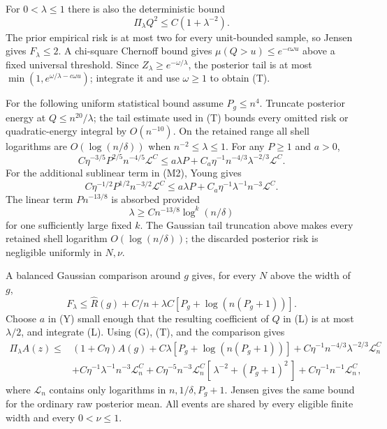 For $0<\lambda\le1$ there is also the deterministic bound
\[
 \Pi_\lambda Q^2\le C(1+\lambda^{-2}). \tag{T}
\]
The prior empirical risk is at most two for every unit-bounded
sample, so Jensen gives $F_\lambda\le2$. A chi-square Chernoff
bound gives $\mu(Q>u)\le e^{-c\omega u}$ above a fixed universal
threshold. Since $Z_\lambda\ge e^{-\omega/\lambda}$,
the posterior tail is at most
$\min(1,e^{\omega/\lambda-c\omega u})$; integrate it and use
$\omega\ge1$ to obtain (T).

For the following uniform statistical bound assume $P_g\le n^4$.
Truncate posterior energy at $Q\le n^{20}/\lambda$; the tail estimate
used in (T) bounds every omitted risk or quadratic-energy integral
by $O(n^{-10})$. On the retained range all shell logarithms are
$O(\log(n/\delta))$ when $n^{-2}\le\lambda\le1$.
For any $P\ge1$ and $a>0$,
\[
 C\eta^{-3/5}P^{2/5}n^{-4/5}\mathcal L^C
 \le a\lambda P+
 C_a\eta^{-1}n^{-4/3}\lambda^{-2/3}\mathcal L^C. \tag{Y}
\]
For the additional sublinear term in (M2), Young gives
\[
 C\eta^{-1/2}P^{1/2}n^{-3/2}\mathcal L^C
 \le a\lambda P+C_a\eta^{-1}\lambda^{-1}n^{-3}\mathcal L^C.
\]
The linear term $Pn^{-13/8}$ is absorbed provided
\[
 \lambda\ge C n^{-13/8}\log^k(n/\delta)
\]
for one sufficiently large fixed $k$. The Gaussian tail truncation
above makes every retained shell logarithm $O(\log(n/\delta))$;
the discarded posterior risk is negligible uniformly in $N,\nu$.

A balanced Gaussian comparison around $g$ gives, for every
$N$ above the width of $g$,
\[
 F_\lambda\le\widehat R(g)
       +C/n+\lambda C[P_g+\log(n(P_g+1))].
\]
Choose $a$ in (Y) small enough that the resulting coefficient
of $Q$ in (L) is at most $\lambda/2$, and integrate (L).
Using (G), (T), and the comparison gives
\begin{align}
 \Pi_\lambda A(z)
 \le &(1+C\eta)A(g)
 +C\lambda[P_g+\log(n(P_g+1))]
 +C\eta^{-1}n^{-4/3}\lambda^{-2/3}\mathcal L_n^C\\
 &+C\eta^{-1}\lambda^{-1}n^{-3}\mathcal L_n^C
 +C\eta^{-5}n^{-3}\mathcal L_n^C
       [\,\lambda^{-2}+(P_g+1)^2\,]+C\eta^{-1}n^{-1}\mathcal L_n^C, \tag{O}
\end{align}
where $\mathcal L_n$ contains only logarithms in
$n,1/\delta,P_g+1$. Jensen gives the same bound for the ordinary
raw posterior mean. All events are shared by every eligible
finite width and every $0<\nu\le1$.

